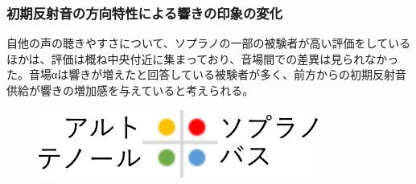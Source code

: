 \documentclass[11pt,a4j]{jreport}
\begin{document}
\subsubsection*{初期反射音の方向特性による響きの印象の変化}
自他の声の聴きやすさについて、ソプラノの一部の被験者が高い評価をしているほかは、評価は概ね中央付近に集まっており、音場間での差異は見られなかった。音場αは響きが増えたと回答している被験者が多く、前方からの初期反射音供給が響きの増加感を与えていると考えられる。

\begin{figure}[H]
  \begin{minipage}{1\linewidth}
    \centering
    \includegraphics[scale=.7]{images/subjectiveExp/scat_0_legend.jpg}
  \end{minipage}


\end{figure}
\end{document}

